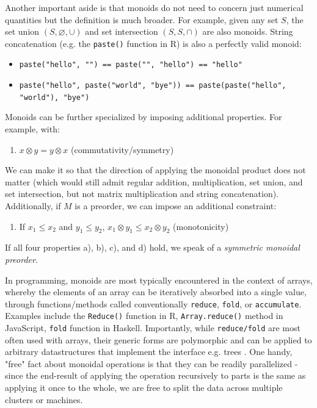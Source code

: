 \documentclass[12pt,a4paper]{article}
\begin{document}
Another important aside is that monoids do not need to concern just numerical quantities but the definition is much broader. For example, given any set $S$, the set union $(S, \varnothing, \cup)$ and set intersection $(S, S, \cap)$ are also monoids. String concatenation (e.g. the \texttt{paste()} function in R) is also a perfectly valid monoid: 

\begin{itemize}
\item \texttt{paste("hello", "") == paste("", "hello") == "hello"}
\item \texttt{paste("hello", paste("world", "bye")) == paste(paste("hello", "world"), "bye")}
\end{itemize}

Monoids can be further specialized by imposing additional properties. For example, with:

\begin{enumerate}
\renewcommand{\theenumi}{\alph{enumi}}
\setcounter{enumi}{2}
\item $x \otimes y = y \otimes x$ (commutativity/symmetry)
\end{enumerate}

We can make it so that the direction of applying the monoidal product does not matter (which would still admit regular addition, multiplication, set union, and set intersection, but not matrix multiplication and string concatenation). Additionally, if $M$ is a preorder, we can impose an additional constraint:

\begin{enumerate}
\renewcommand{\theenumi}{\alph{enumi}}
\setcounter{enumi}{3}
\item If $x_1 \leq x_2$ and $y_1 \leq y_2$, $x_1 \otimes y_1 \leq x_2 \otimes y_2$ (monotonicity)
\end{enumerate}

If all four properties a), b), c), and d) hold, we speak of a \textit{symmetric monoidal preorder}. 

In programming, monoids are most typically encountered in the context of arrays, whereby the elements of an array can be iteratively absorbed into a single value, through functions/methods called conventionally \texttt{reduce}, \texttt{fold}, or \texttt{accumulate}. Examples include the \texttt{Reduce()} function in R, \texttt{Array.reduce()} method in JavaScript, \texttt{fold} function in Haskell. Importantly, while \texttt{reduce/fold} are most often used with arrays, their generic forms are polymorphic and can be applied to arbitrary datastructures that implement the interface e.g. trees \citep{braithwaite2019}. One handy, "free" fact about monoidal operations is that they can be readily parallelized - since the end-result of applying the operation recursively to parts is the same as applying it once to the whole, we are free to split the data across multiple clusters or machines.  
\end{document}
